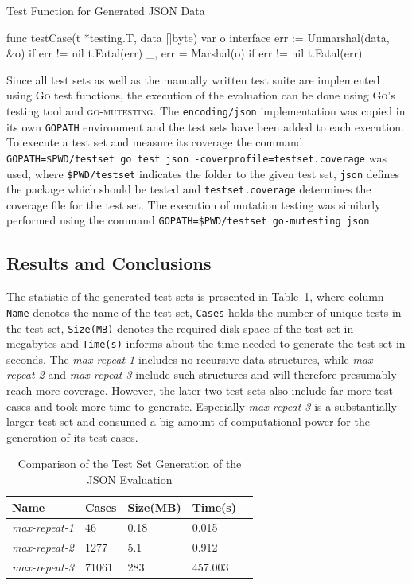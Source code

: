 \begin{listing}
\caption{Test Function for Generated JSON Data}
\label{lst:evaluationJSONTestFunction}
\begin{gocode}
func testCase(t *testing.T, data []byte) {
  var o interface{}
  err := Unmarshal(data, &o)
  if err != nil {
    t.Fatal(err)
  }
  _, err = Marshal(o)
  if err != nil {
    t.Fatal(err)
  }
}
\end{gocode}
\end{listing}

Since all test sets as well as the manually written test suite are implemented using \textsc{Go} test functions, the execution of the evaluation can be done using \textsc{Go}'s testing tool and \textsc{go-mutesting}. The \texttt{encoding/json} implementation was copied in its own \texttt{GOPATH} environment and the test sets have been added to each execution. To execute a test set and measure its coverage the command \texttt{GOPATH=\$PWD/testset go test json -coverprofile=testset.coverage} was used, where \texttt{\$PWD/testset} indicates the folder to the given test set, \texttt{json} defines the package which should be tested and \texttt{testset.coverage} determines the coverage file for the test set. The execution of mutation testing was similarly performed using the command \texttt{GOPATH=\$PWD/testset go-mutesting json}.

\subsection{Results and Conclusions}
\label{subsec:evaluationJSONResultsConclusions}

The statistic of the generated test sets is presented in Table~\ref{table:evaluationJSONGeneration}, where column \texttt{Name} denotes the name of the test set, \texttt{Cases} holds the number of unique tests in the test set, \texttt{Size(MB)} denotes the required disk space of the test set in megabytes and \texttt{Time(s)} informs about the time needed to generate the test set in seconds. The \emph{max-repeat-1} includes no recursive data structures, while \emph{max-repeat-2} and \emph{max-repeat-3} include such structures and will therefore presumably reach more coverage. However, the later two test sets also include far more test cases and took more time to generate. Especially \emph{max-repeat-3} is a substantially larger test set and consumed a big amount of computational power for the generation of its test cases.

\begin{table}
\caption{Comparison of the Test Set Generation of the JSON Evaluation}
\label{table:evaluationJSONGeneration}
\center
\begin{tabular}{| l | l | l | l | l |}
\hline \textbf{Name} & \textbf{Cases} & \textbf{Size(MB)} & \textbf{Time(s)} \tabularnewline
\hline \emph{max-repeat-1} & 46 & 0.18 & 0.015 \tabularnewline
\hline \emph{max-repeat-2} & 1277 & 5.1 & 0.912 \tabularnewline
\hline \emph{max-repeat-3} & 71061 & 283 & 457.003 \tabularnewline
\hline \end{tabular}
\end{table}

